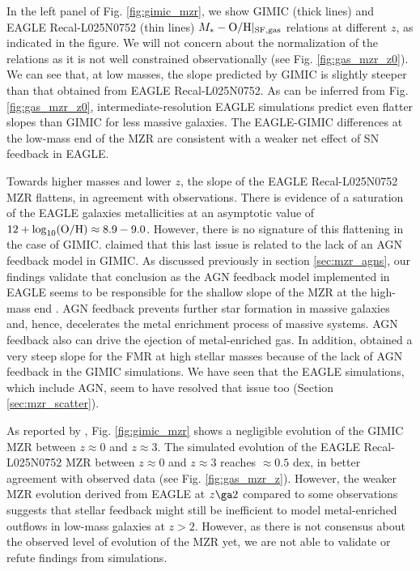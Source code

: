 \documentclass[useAMS,usenatbib]{mn2e}
\begin{document}
In the left panel of Fig. \ref{fig:gimic_mzr}, we show {\sc GIMIC} (thick lines) and 
{\sc EAGLE} Recal-L025N0752 (thin lines) $M_* - {\rm O/H}|_{\rm SF,gas}$ relations at different $z$, as indicated in the figure.
We will not concern about the normalization of the relations as it is not well constrained
observationally (see Fig. \ref{fig:gas_mzr_z0}).
We can see that, at low masses, the slope predicted by {\sc GIMIC} is slightly steeper than that
obtained from {\sc EAGLE} Recal-L025N0752.
As can be inferred from Fig. \ref{fig:gas_mzr_z0}, 
intermediate-resolution {\sc EAGLE} simulations predict even flatter slopes than {\sc GIMIC} 
for less massive galaxies.
The {\sc EAGLE}-{\sc GIMIC} differences at
the low-mass end of the MZR are consistent with a weaker net effect of SN feedback in {\sc EAGLE}.


Towards higher masses and lower $z$, the slope of the {\sc EAGLE} Recal-L025N0752 MZR flattens,
in agreement with observations.
There is evidence of a saturation of 
the {\sc EAGLE} galaxies metallicities 
at an asymptotic value of $12+ \log_{10} ({\rm O/H}) \approx 8.9-9.0$.
However, there is no signature of this flattening in the case of {\sc GIMIC}. \citet{derossi2015}
claimed that this last issue
is related to the lack of an AGN feedback model in GIMIC. 
As discussed previously in section \ref{sec:mzr_agns}, our findings validate that conclusion as
the AGN feedback model implemented in {\sc EAGLE} seems to be responsible for the 
shallow slope of the MZR at the high-mass end \citep[see also][]{crain2015,segers2016b}.  
AGN feedback prevents further
star formation in massive galaxies and, hence, decelerates the metal enrichment process of
massive systems.  AGN feedback also can drive the ejection of metal-enriched gas.
In addition, 
\citet{derossi2015} obtained a very steep slope for the FMR at high stellar masses
because of the lack of AGN feedback in the {\sc GIMIC} simulations.
We have seen that the {\sc EAGLE} simulations, 
which include AGN, seem to have resolved
that issue too (Section \ref{sec:mzr_scatter}).

As reported by \citet{derossi2015}, Fig. \ref{fig:gimic_mzr} shows a negligible evolution  
of the {\sc GIMIC} MZR between $z\approx 0$ and $z\approx 3$.  
The simulated evolution of the {\sc EAGLE} Recal-L025N0752 MZR between $z\approx 0$ and 
$z\approx 3$ reaches $\approx 0.5$ dex, 
in better agreement with observed data (see Fig. \ref{fig:gas_mzr_z}).
However, the weaker MZR evolution derived from {\sc EAGLE} at $z \ga 2$ compared to some observations
\citep[e.g.][]{maiolino2008,onodera2016}
suggests that stellar feedback might still be inefficient to model metal-enriched outflows in 
low-mass galaxies at $z > 2$. However, as there is not consensus about the observed level of evolution of the MZR yet, 
we are not able to validate or refute findings from simulations.
\end{document}
